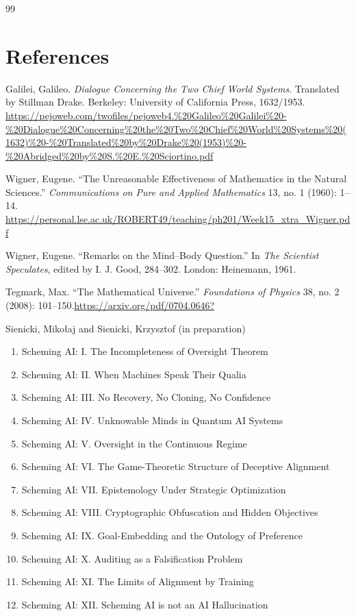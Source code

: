 \documentclass[11pt]{article}
\numberwithin{equation}{section} %
\begin{document}
\begin{thebibliography}{99}
\section{References}
Galilei, Galileo. \textit{Dialogue Concerning the Two Chief World Systems}. Translated by Stillman Drake. Berkeley: University of California Press, 1632/1953. \url{https://pejoweb.com/twofiles/pejoweb4.%20Galileo%20Galilei%20-%20Dialogue%20Concerning%20the%20Two%20Chief%20World%20Systems%20(1632)%20-%20Translated%20by%20Drake%20(1953)%20-%20Abridged%20by%20S.%20E.%20Sciortino.pdf}

Wigner, Eugene. “The Unreasonable Effectiveness of Mathematics in the Natural Sciences.” \textit{Communications on Pure and Applied Mathematics} 13, no. 1 (1960): 1–14. \url{https://personal.lse.ac.uk/ROBERT49/teaching/ph201/Week15_xtra_Wigner.pdf}

Wigner, Eugene. “Remarks on the Mind–Body Question.” In \textit{The Scientist Speculates}, edited by I. J. Good, 284–302. London: Heinemann, 1961.

Tegmark, Max. “The Mathematical Universe.” \textit{Foundations of Physics} 38, no. 2 (2008): 101–150.\url{https://arxiv.org/pdf/0704.0646?}

Sienicki, Mikołaj and Sienicki, Krzysztof (in preparation)
\begin{enumerate}
    \item Scheming AI: I. \quad The Incompleteness of Oversight Theorem
\item Scheming AI: II. \quad When Machines Speak Their Qualia
\item Scheming AI: III. \quad No Recovery, No Cloning, No Confidence
\item Scheming AI: IV. \quad Unknowable Minds in Quantum AI Systems
\item Scheming AI: V. \quad Oversight in the Continuous Regime
\item Scheming AI: VI. \quad The Game-Theoretic Structure of Deceptive Alignment
\item Scheming AI: VII. \quad Epistemology Under Strategic Optimization
\item Scheming AI: VIII. \quad Cryptographic Obfuscation and Hidden Objectives
\item Scheming AI: IX. \quad Goal-Embedding and the Ontology of Preference
\item Scheming AI: X. \quad Auditing as a Falsification Problem
\item Scheming AI: XI. \quad The Limits of Alignment by Training
\item Scheming AI: XII. \quad Scheming AI is not an AI Hallucination
\end{enumerate}


\end{thebibliography}
\end{document}

